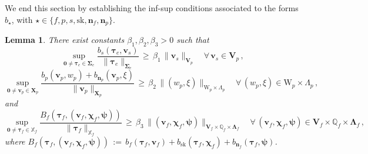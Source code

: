 \documentclass[11pt]{article}
\numberwithin{equation}{section}
\newcommand{\bLambda}{{\boldsymbol\Lambda}}
\newcommand{\bSigma}{{\boldsymbol\Sigma}}
\newcommand{\bpsi}{{\boldsymbol\psi}}
\newcommand{\btau}{{\boldsymbol\tau}}
\newcommand{\bchi}{{\boldsymbol\chi}}
\newcommand{\bv}{{\mathbf{v}}}
\newcommand{\bn}{{\mathbf{n}}}
\newcommand{\0}{{\mathbf{0}}}
\def\bX{\mathbf{X}}
\def\bV{\mathbf{V}}
\newcommand\bbQ{\mathbb{Q}}
\newcommand\bbX{\mathbb{X}}
\def\W{\mathrm{W}}
\def\sk{\mathrm{sk}}
\newtheorem{lem}[thm]{Lemma}
\numberwithin{equation}{section}
\begin{document}
We end this section by establishing the inf-sup conditions associated to the forms $b_\star$, with $\star\in \{f, p, s, \sk, \bn_f, \bn_p \}$.
\begin{lem}\label{lem:inf-sup-conditions}
There exist constants $\beta_1, \beta_2, \beta_3 > 0$ such that
\begin{equation}\label{eq:inf-sup-vs}
\sup_{\0\neq \btau_e\in \bSigma_e} \frac{b_s(\btau_e,\bv_s)}{\|\btau_e\|_{\bSigma_e}} 
\,\geq\, \beta_1\,\|\bv_s\|_{\bV_p} \quad \forall\,\bv_s\in \bV_p \,,
\end{equation}
%
\begin{equation}\label{eq:inf-sup-qp-xi}
\sup_{\0\neq \bv_p\in \bX_p} \frac{b_p(\bv_p,w_p) + b_{\bn_p}(\bv_p,\xi)}{\|\bv_p\|_{\bX_p}} 
\,\geq\, \beta_2\,\|(w_p,\xi)\|_{\W_p\times \Lambda_p} \quad \forall\,(w_p,\xi)\in \W_p\times \Lambda_p\,,
\end{equation}
and
\begin{equation}\label{eq:inf-sup-vf-chif}
\sup_{\0\neq \btau_f\in \bbX_f} \frac{B_f(\btau_f,(\bv_f,\bchi_f,\bpsi))}{\|\btau_f\|_{\bbX_f}} 
\,\geq\, \beta_3\,\|(\bv_f, \bchi_f, \bpsi)\|_{\bV_f\times \bbQ_f\times \bLambda_f} \quad \forall\,(\bv_f,\bchi_f,\bpsi)\in \bV_f\times \bbQ_f\times \bLambda_f\,,
\end{equation}
where 
$B_f(\btau_f,(\bv_f,\bchi_f,\bpsi)) \,:=\, b_f(\btau_f,\bv_f) + b_\sk(\btau_f,\bchi_f) + b_{\bn_f}(\btau_f,\bpsi)$.
\end{lem}
%
\end{document}
